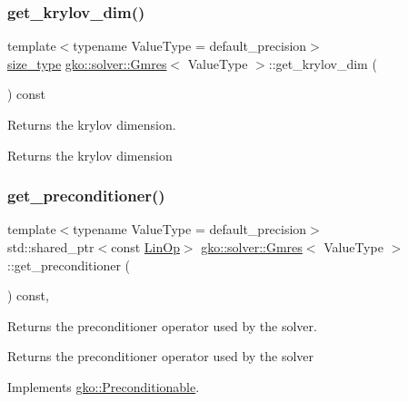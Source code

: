 \subsubsection{\texorpdfstring{get\+\_\+krylov\+\_\+dim()}{get\_krylov\_dim()}}
{\footnotesize\ttfamily template$<$typename Value\+Type  = default\+\_\+precision$>$ \\
\hyperlink{namespacegko_a6e5c95df0ae4e47aab2f604a22d98ee7}{size\+\_\+type} \hyperlink{classgko_1_1solver_1_1Gmres}{gko\+::solver\+::\+Gmres}$<$ Value\+Type $>$\+::get\+\_\+krylov\+\_\+dim (\begin{DoxyParamCaption}{ }\end{DoxyParamCaption}) const}



Returns the krylov dimension. 

\begin{DoxyReturn}{Returns}
the krylov dimension 
\end{DoxyReturn}
\mbox{\label{classgko_1_1solver_1_1Gmres_ac2e3e0024a37647eda9f8a7f5b4cefb4}} 
\subsubsection{\texorpdfstring{get\+\_\+preconditioner()}{get\_preconditioner()}}
{\footnotesize\ttfamily template$<$typename Value\+Type  = default\+\_\+precision$>$ \\
std\+::shared\+\_\+ptr$<$const \hyperlink{classgko_1_1LinOp}{Lin\+Op}$>$ \hyperlink{classgko_1_1solver_1_1Gmres}{gko\+::solver\+::\+Gmres}$<$ Value\+Type $>$\+::get\+\_\+preconditioner (\begin{DoxyParamCaption}{ }\end{DoxyParamCaption}) const\hspace{0.3cm}{\ttfamily [override]}, {\ttfamily [virtual]}}



Returns the preconditioner operator used by the solver. 

\begin{DoxyReturn}{Returns}
the preconditioner operator used by the solver 
\end{DoxyReturn}


Implements \hyperlink{classgko_1_1Preconditionable_ad9545089aef0dfc83bc7a74e5bf1d748}{gko\+::\+Preconditionable}.

